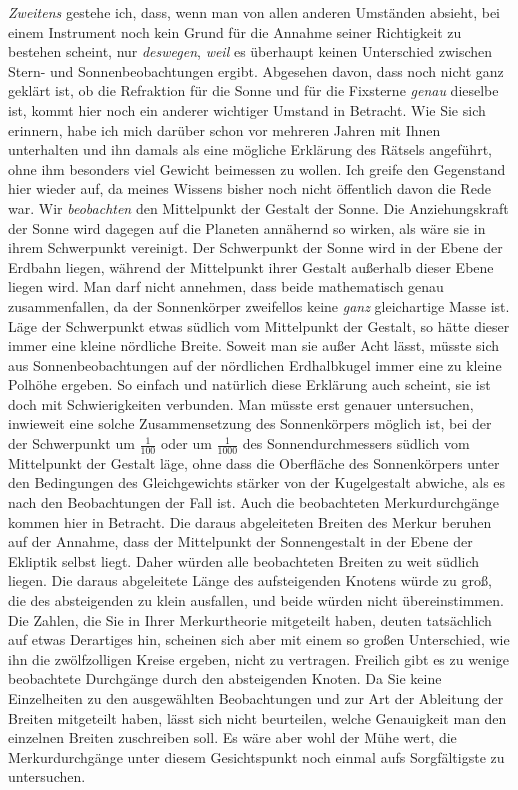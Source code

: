 \par\indent \emph{Zweitens} gestehe ich, dass, wenn man von allen anderen Umständen absieht, bei einem Instrument noch kein Grund für die Annahme seiner Richtigkeit zu bestehen scheint, nur \emph{deswegen}, \emph{weil} es überhaupt keinen Unterschied zwischen Stern- und Sonnenbeobachtungen ergibt. Abgesehen davon, dass noch nicht ganz geklärt ist, ob die Refraktion für die Sonne und für die Fixsterne \emph{genau} dieselbe ist, kommt hier noch ein anderer wichtiger Umstand in Betracht. Wie Sie sich erinnern, habe ich mich darüber schon vor mehreren Jahren mit Ihnen unterhalten und ihn damals als eine mögliche Erklärung des Rätsels angeführt, ohne ihm besonders viel Gewicht beimessen zu wollen. Ich greife den Gegenstand hier wieder auf, da meines Wissens bisher noch nicht öffentlich davon die Rede war. Wir \emph{beobachten} den Mittelpunkt der Gestalt der Sonne. Die Anziehungskraft der Sonne wird dagegen auf die Planeten annähernd so wirken, als wäre sie in ihrem Schwerpunkt vereinigt. Der Schwerpunkt der Sonne wird in der Ebene der Erdbahn liegen, während der Mittelpunkt ihrer Gestalt außerhalb dieser Ebene liegen wird. Man darf nicht annehmen, dass beide mathematisch genau zusammenfallen, da der Sonnenkörper zweifellos keine \emph{ganz} gleichartige Masse ist. Läge der Schwerpunkt etwas südlich vom Mittelpunkt der Gestalt, so hätte dieser immer  eine kleine nördliche Breite. Soweit man sie außer Acht lässt, müsste sich aus Sonnenbeobachtungen auf der nördlichen Erdhalbkugel immer eine zu kleine Polhöhe ergeben. So einfach und natürlich diese Erklärung auch scheint, sie ist doch mit Schwierigkeiten verbunden. Man müsste erst genauer untersuchen, inwieweit eine solche Zusammensetzung des Sonnenkörpers möglich ist, bei der der Schwerpunkt um $\frac{1}{100}$ oder um $\frac{1}{1000}$ des Sonnendurchmessers südlich vom Mittelpunkt der Gestalt läge, ohne dass die Oberfläche des Sonnenkörpers unter den Bedingungen des Gleichgewichts stärker von der Kugelgestalt abwiche, als es nach den Beobachtungen der Fall ist. Auch die beobachteten Merkurdurchgänge kommen hier in Betracht. Die daraus abgeleiteten Breiten des Merkur beruhen auf der Annahme, dass der Mittelpunkt der Sonnengestalt in der Ebene der Ekliptik selbst liegt. Daher würden alle beobachteten Breiten zu weit südlich liegen. Die daraus abgeleitete Länge des aufsteigenden Knotens würde zu groß, die des absteigenden zu klein ausfallen, und beide würden nicht übereinstimmen. Die Zahlen, die Sie in Ihrer Merkurtheorie mitgeteilt haben, deuten tatsächlich auf etwas Derartiges hin, scheinen sich aber mit einem so großen Unterschied, wie ihn die zwölfzolligen Kreise ergeben, nicht zu vertragen. Freilich gibt es zu wenige beobachtete Durchgänge durch den absteigenden Knoten. Da Sie keine Einzelheiten zu den ausgewählten Beobachtungen und zur Art der Ableitung der Breiten mitgeteilt haben, lässt sich nicht beurteilen, welche Genauigkeit man den einzelnen Breiten zuschreiben soll. Es wäre aber wohl der Mühe wert, die Merkurdurchgänge unter diesem Gesichtspunkt noch einmal aufs Sorgfältigste zu untersuchen.

